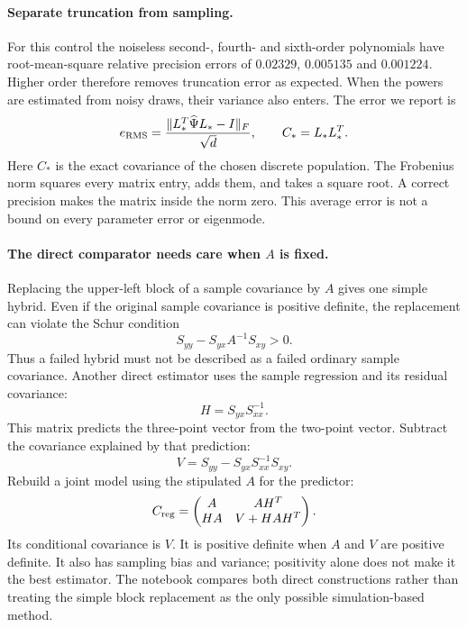 \documentclass[11pt]{article}
\begin{document}
\paragraph{Separate truncation from sampling.}
For this control the noiseless second-, fourth- and sixth-order polynomials
have root-mean-square relative precision errors of $0.02329$, $0.005135$
and $0.001224$. Higher order therefore removes truncation error as expected.
When the powers are estimated from noisy draws, their variance also enters.
The error we report is
\begin{equation}
 e_{\rm RMS}=\frac{\|L_*^T\widehat\Psi L_*-I\|_F}{\sqrt d},
 \qquad C_*=L_*L_*^T.
\end{equation}
Here $C_*$ is the exact covariance of the chosen discrete population.
The Frobenius norm squares every matrix entry, adds them, and takes a
square root. A correct precision makes the matrix inside the norm zero.
This average error is not a bound on every parameter error or eigenmode.

\paragraph{The direct comparator needs care when $A$ is fixed.}
Replacing the upper-left block of a sample covariance by $A$ gives one
simple hybrid. Even if the original sample covariance is positive definite,
the replacement can violate the Schur condition
\begin{equation}
 S_{yy}-S_{yx}A^{-1}S_{xy}>0.
\end{equation}
Thus a failed hybrid must not be described as a failed ordinary sample
covariance. Another direct estimator uses the sample regression and its
residual covariance:
\begin{equation}
 H=S_{yx}S_{xx}^{-1}.
\end{equation}
This matrix predicts the three-point vector from the two-point vector.
Subtract the covariance explained by that prediction:
\begin{equation}
 V=S_{yy}-S_{yx}S_{xx}^{-1}S_{xy}.
\end{equation}
Rebuild a joint model using the stipulated $A$ for the predictor:
\begin{equation}
 C_{\rm reg}=\begin{pmatrix} A&A H^T\\H A&V+H A H^T\end{pmatrix}.
\end{equation}
Its conditional covariance is $V$. It is positive definite when $A$ and
$V$ are positive definite. It also has sampling bias and variance; positivity
alone does not make it the best estimator. The notebook compares both direct
constructions rather than treating the simple block replacement as the
only possible simulation-based method.
\end{document}

